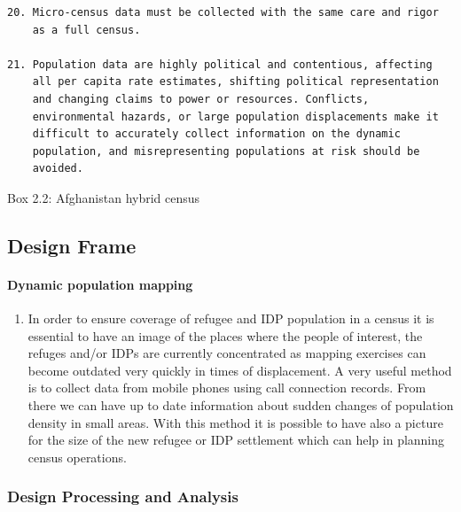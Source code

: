 \documentclass[
]{article}
\providecommand{\tightlist}{%
  \setlength{\itemsep}{0pt}\setlength{\parskip}{0pt}}
\begin{document}
\begin{verbatim}
20. Micro-census data must be collected with the same care and rigor
    as a full census.

21. Population data are highly political and contentious, affecting
    all per capita rate estimates, shifting political representation
    and changing claims to power or resources. Conflicts,
    environmental hazards, or large population displacements make it
    difficult to accurately collect information on the dynamic
    population, and misrepresenting populations at risk should be
    avoided.
\end{verbatim}

Box 2.2: Afghanistan hybrid census

\hypertarget{design-frame}{%
\subsection{Design Frame}\label{design-frame}}

\hypertarget{a.-dynamic-population-mapping}{%
\paragraph{Dynamic population mapping}\label{a.-dynamic-population-mapping}}

\begin{enumerate}
\def\labelenumi{\arabic{enumi}.}
\setcounter{enumi}{106}
\tightlist
\item
  In order to ensure coverage of refugee and IDP population in a
  census it is essential to have an image of the places where the
  people of interest, the refuges and/or IDPs are currently
  concentrated as mapping exercises can become outdated very quickly
  in times of displacement. A very useful method is to collect data
  from mobile phones using call connection records. From there we can
  have up to date information about sudden changes of population
  density in small areas. With this method it is possible to have also
  a picture for the size of the new refugee or IDP settlement which
  can help in planning census operations.
\end{enumerate}

\hypertarget{design-processing-and-analysis}{%
\subsubsection{Design Processing and Analysis}\label{design-processing-and-analysis}}
\end{document}
